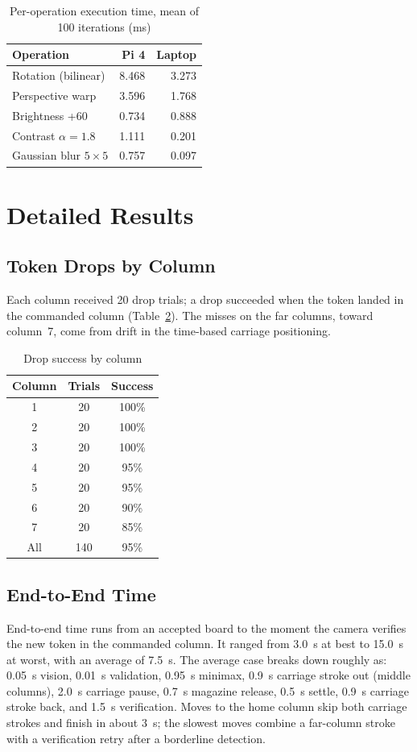 \documentclass[conference]{IEEEtran}
\begin{document}
\begin{table}[t]
\caption{Per-operation execution time, mean of 100 iterations (ms)}
\label{tab:bench}
\centering
\small
\begin{tabular}{lrr}
\toprule
\textbf{Operation} & \textbf{Pi 4} & \textbf{Laptop} \\
\midrule
Rotation (bilinear) & 8.468 & 3.273 \\
Perspective warp & 3.596 & 1.768 \\
Brightness +60 & 0.734 & 0.888 \\
Contrast $\alpha = 1.8$ & 1.111 & 0.201 \\
Gaussian blur $5\times5$ & 0.757 & 0.097 \\
\bottomrule
\end{tabular}
\end{table}

\section{Detailed Results}

\subsection{Token Drops by Column}
Each column received 20 drop trials; a drop succeeded when the token landed in the commanded column (Table~\ref{tab:drops}). The misses on the far columns, toward column~7, come from drift in the time-based carriage positioning.

\begin{table}[t]
\caption{Drop success by column}
\label{tab:drops}
\centering
\small
\begin{tabular}{ccc}
\toprule
\textbf{Column} & \textbf{Trials} & \textbf{Success} \\
\midrule
1 & 20 & 100\% \\
2 & 20 & 100\% \\
3 & 20 & 100\% \\
4 & 20 & 95\% \\
5 & 20 & 95\% \\
6 & 20 & 90\% \\
7 & 20 & 85\% \\
\midrule
All & 140 & 95\% \\
\bottomrule
\end{tabular}
\end{table}

\subsection{End-to-End Time}
End-to-end time runs from an accepted board to the moment the camera verifies the new token in the commanded column. It ranged from 3.0~s at best to 15.0~s at worst, with an average of 7.5~s. The average case breaks down roughly as: 0.05~s vision, 0.01~s validation, 0.95~s minimax, 0.9~s carriage stroke out (middle columns), 2.0~s carriage pause, 0.7~s magazine release, 0.5~s settle, 0.9~s carriage stroke back, and 1.5~s verification. Moves to the home column skip both carriage strokes and finish in about 3~s; the slowest moves combine a far-column stroke with a verification retry after a borderline detection.
\end{document}
